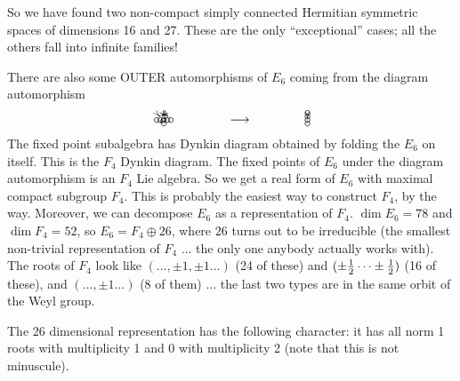 \begin{example}
   So we have found two non-compact simply connected Hermitian symmetric spaces of
   dimensions 16 and 27. These are the only ``exceptional'' cases; all the others fall
   into infinite families!

   There are also some OUTER automorphisms of $E_6$ coming from the diagram
   automorphism
   \[\begin{xy}
     (0,0)="1" *\cir<2pt>{};
     (1,0)="2"  *\cir<2pt>{} **@{-};
     p+(1,0) *\cir<2pt>{} **@{-};
     p+(0,-1) *\cir<2pt>{} **@{-},
     p+(1,0)="22" *\cir<2pt>{} **@{-};
     p+(1,0)="11" *\cir<2pt>{} **@{-};
     "1" *+{\ };"11" *+{\ } **\crv{(2,3.3)} ?<*@{<} ?>*@{>} ?(.5)*+!U{\sigma},
     "2" *+{\ };"22" *+{\ } **\crv{(2,2.6)} ?<*@{<} ?>*@{>},
   \end{xy}\qquad \qquad \longrightarrow \qquad \qquad
   \begin{xy}
      (0,2) *\cir<2pt>{};
      p+(0,-1)  *\cir<2pt>{} **@{-};
      p+(0,-1)="x" *\cir<2pt>{} **@{=} ?*@{>};
      "x" *+<4pt>{\ };"x"+(0,-1) *\cir<2pt>{} **@{-};
   \end{xy}
   \]
   The fixed point subalgebra has Dynkin diagram
   obtained by folding the $E_6$ on itself. This is the $F_4$ Dynkin diagram. The
   fixed points of $E_6$ under the diagram automorphism is an $F_4$ Lie algebra. So we
   get a real form of $E_6$ with maximal compact subgroup $F_4$. This is probably the
   easiest way to construct $F_4$, by the way. Moreover, we can decompose $E_6$ as a
   representation of $F_4$. $\dim E_6=78$ and $\dim F_4=52$, so $E_6=F_4\oplus 26$,
   where $26$ turns out to be irreducible (the smallest non-trivial representation of
   $F_4$ ... the only one anybody actually works with). The roots of $F_4$ look like
   $(\dots, \pm 1, \pm 1\dots)$ (24 of these) and $(\pm \frac{1}{2} \dots \pm \frac{1}{2})$ (16 of
   these), and $(\dots, \pm 1\dots)$ (8 of them) ... the last two types are in the
   same orbit of the Weyl group.

   The 26 dimensional representation has the following character: it has all norm 1
   roots with multiplicity 1 and 0 with multiplicity 2 (note that this is not
   minuscule).


\end{example}
